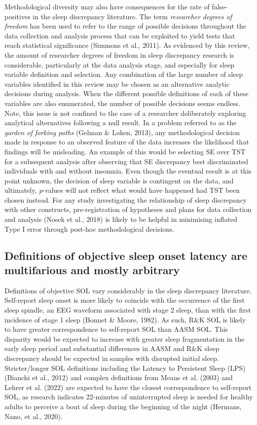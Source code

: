 \documentclass[
]{article}
\begin{document}
Methodological diversity may also have consequences for the rate of false-positives in the sleep discrepancy literature. The term \emph{researcher degrees of freedom} has been used to refer to the range of possible decisions throughout the data collection and analysis process that can be exploited to yield tests that reach statistical significance (Simmons et al., 2011). As evidenced by this review, the amount of researcher degrees of freedom in sleep discrepancy research is considerable, particularly at the data analysis stage, and especially for sleep variable definition and selection. Any combination of the large number of sleep variables identified in this review may be chosen as an alternative analytic decisions during analysis. When the different possible definitions of each of these variables are also enumerated, the number of possible decisions seems endless. Note, this issue is not confined to the case of a researcher deliberately exploring analytical alternatives following a null result. In a problem referred to as the \emph{garden of forking paths} (Gelman \& Loken, 2013), any methodological decision made in response to an observed feature of the data increases the likelihood that findings will be misleading. An example of this would be selecting SE over TST for a subsequent analysis after observing that SE discrepancy best discriminated individuals with and without insomnia. Even though the eventual result is at this point unknown, the decision of sleep variable is contingent on the data, and ultimately, \emph{p}-values will not reflect what would have happened had TST been chosen instead. For any study investigating the relationship of sleep discrepancy with other constructs, pre-registration of hypotheses and plans for data collection and analysis (Nosek et al., 2018) is likely to be helpful in minimising inflated Type I error through post-hoc methodological decisions.

\subsection{Definitions of objective sleep onset latency are multifarious and mostly arbitrary}\label{sol}

Definitions of objective SOL vary considerably in the sleep discrepancy literature. Self-report sleep onset is more likely to coincide with the occurrence of the first sleep spindle, an EEG waveform associated with stage 2 sleep, than with the first incidence of stage 1 sleep (Bonnet \& Moore, 1982). As such, R\&K SOL is likely to have greater correspondence to self-report SOL than AASM SOL. This disparity would be expected to increase with greater sleep fragmentation in the early sleep period and substantial differences in AASM and R\&K sleep discrepancy should be expected in samples with disrupted initial sleep. Stricter/longer SOL definitions including the Latency to Persistent Sleep (LPS) (Bianchi et al., 2012) and complex definitions from Means et al. (2003) and Lehrer et al. (2022) are expected to have the closest correspondence to self-report SOL, as research indicates 22-minutes of uninterrupted sleep is needed for healthy adults to perceive a bout of sleep during the beginning of the night (Hermans, Nano, et al., 2020).
\end{document}
